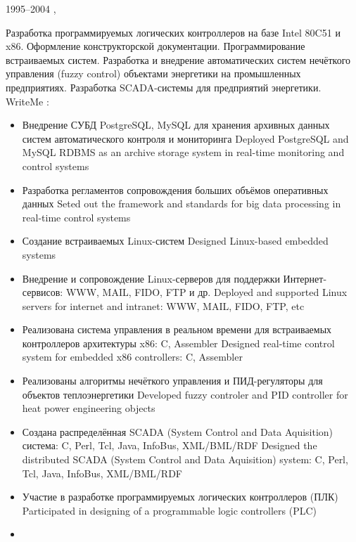 \documentclass[11pt,a4paper,sans, russian]{moderncv}        %
\begin{document}
\cventry
{1995--2004}
{\leadsoftdeveloper}
{\protect{}}
{\citykirov, \country}{}
{
{Разработка программируемых логических контроллеров на базе Intel 80C51 и x86. Оформление конструкторской документации. Программирование встраиваемых систем. Разработка и внедрение автоматических систем нечёткого управления (fuzzy control) объектами энергетики на промышленных предприятиях. Разработка SCADA-системы для предприятий энергетики.}
{WriteMe}
\newline{}
\achievements:
\begin{itemize}
	\item {}
		{Внедрение СУБД PostgreSQL, MySQL для хранения архивных данных систем автоматического контроля и мониторинга}
		{Deployed PostgreSQL and MySQL RDBMS as an archive storage system in real-time monitoring and control systems}
	\item {}
		{Разработка регламентов сопровождения больших объёмов оперативных данных}
		{Seted out the framework and standards for big data processing in real-time control systems}
	\item {}
		{Создание встраиваемых Linux-систем}
		{Designed Linux-based embedded systems}
	\item {}
		{Внедрение и сопровождение Linux-серверов для поддержки Интернет-сервисов: WWW, MAIL, FIDO, FTP и др.}
		{Deployed and supported Linux servers for internet and intranet: WWW, MAIL, FIDO, FTP, etc}
	\item {}
		{Реализована система управления в реальном времени для встраиваемых контроллеров архитектуры x86: C, Assembler}
		{Designed real-time control system for embedded x86 controllers: C, Assembler}
	\item {}
		{Реализованы алгоритмы нечёткого управления и ПИД-регуляторы для объектов теплоэнергетики}
		{Developed fuzzy controler and PID controller for heat power engineering objects}
	\item {}
		{Создана распределённая SCADA (System Control and Data Aquisition) система: C, Perl, Tcl, Java, InfoBus, XML/BML/RDF}
		{Designed the distributed SCADA (System Control and Data Aquisition) system: C, Perl, Tcl, Java, InfoBus, XML/BML/RDF }
	\item {}
		{Участие в разработке программируемых логических контроллеров (ПЛК)}
		{Participated in designing of a programmable logic controllers (PLC)}
	\item {}

\end{itemize}}
\end{document}
